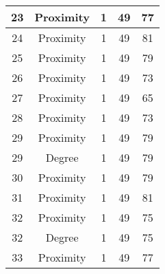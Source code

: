 \documentclass[results.tex]{subfiles}
\begin{document}
\begin{center}
\begin{tabular}{| c || c | c | c | c |}
            \hline
            23                      & Proximity                    & 1                      & 49                      & 77                   \\
            \hline
            24                      & Proximity                    & 1                      & 49                      & 81                   \\
            \hline
            25                      & Proximity                    & 1                      & 49                      & 79                   \\
            \hline
            26                      & Proximity                    & 1                      & 49                      & 73                   \\
            \hline
            27                      & Proximity                    & 1                      & 49                      & 65                   \\
            \hline
            28                      & Proximity                    & 1                      & 49                      & 73                   \\
            \hline
            29                      & Proximity                    & 1                      & 49                      & 79                   \\
            \hline
            29                      & Degree                       & 1                      & 49                      & 79                   \\
            \hline
            30                      & Proximity                    & 1                      & 49                      & 79                   \\
            \hline
            31                      & Proximity                    & 1                      & 49                      & 81                   \\
            \hline
            32                      & Proximity                    & 1                      & 49                      & 75                   \\
            \hline
            32                      & Degree                       & 1                      & 49                      & 75                   \\
            \hline
            33                      & Proximity                    & 1                      & 49                      & 77                   \\

\end{tabular}
\end{center}
\end{document}
